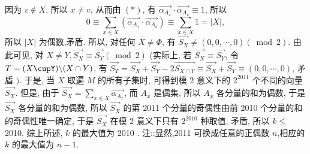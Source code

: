 因为 $v \notin X$, 所以 $x \neq v$, 从而由 $(*)$, 有 $\overrightarrow{\alpha_{A_x}} \cdot \overrightarrow{\alpha_{A_v}} \equiv 1$, 所以
$$
0 \equiv \sum_{x \in X}\left(\overrightarrow{\alpha_{A_x}} \cdot \overrightarrow{\alpha_{A_v}}\right) \equiv \sum_{x \in X} 1=|X|,
$$
所以 $|X|$ 为偶数,矛盾.
所以, 对任何 $X \neq \Phi$, 有 $\overrightarrow{S_X} \neq(0,0, \cdots, 0)(\bmod 2)$.
由此可见, 对 $X \neq Y, \overrightarrow{S_X} \equiv \overrightarrow{S_Y}(\bmod 2)$ (实际上, 若 $\overrightarrow{S_X} \equiv \overrightarrow{S_Y}$, 令 $T=(X \cupY) \backslash(X \cap Y)$, 有 $\overrightarrow{S_T}=\overrightarrow{S_X}+\overrightarrow{S_Y}-2 \overrightarrow{S_{X \cap Y}} \equiv \overrightarrow{S_X}+\overrightarrow{S_Y} \equiv(0,0, \cdots, 0)$, 矛盾 $)$. 于是, 当 $X$ 取遍 $M$ 的所有子集时, 可得到模 2 意义下的 $2^{2011}$ 个不同的向量 $\overrightarrow{S_X}$.
但是, 由于 $\overrightarrow{S_X}=\sum_{x \in X} \overrightarrow{\alpha_{A_x}}$, 而 $A_x$ 是偶集, 所以 $A_x$ 各分量的和为偶数, 于是 $\overrightarrow{S_X}$ 各分量的和为偶数, 所以 $\overrightarrow{S_X}$ 的第 2011 个分量的奇偶性由前 2010 个分量的和的奇偶性唯一确定, 于是 $\overrightarrow{S_X}$ 在模 2 意义下只有 $2^{2010}$ 种取值, 矛盾, 所以 $k \leqslant$ 2010.
综上所述, $k$ 的最大值为 2010 .
注::显然,2011 可换成任意的正偶数 $n$,相应的 $k$ 的最大值为 $n-1$.


